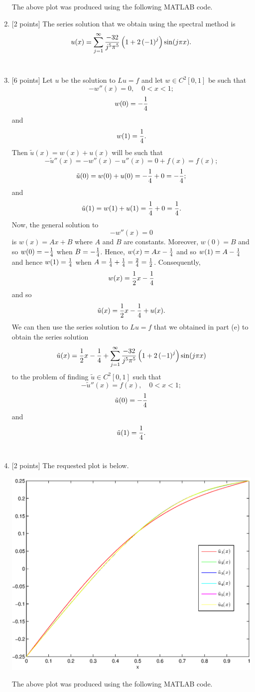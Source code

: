 \begin{solution}
\begin{enumerate}
The above plot was produced using the following MATLAB code.



\item {[2 points]} The series solution that we obtain using the spectral method is
\[
u(x)=\sum_{j=1}^\infty{-32\over j^5\pi^5}\left(1+2\left(-1\right)^j\right)\sin(j\pi x).
\]
\\
\item {[6 points]} Let $u$ be the solution to $Lu=f$ and let $w\in C^2[0,1]$ be such that
\[
-w''(x)=0,\quad0<x<1;
\]
\[
w(0)=-{1\over4}
\]
and
\[
w(1)={1\over4}.
\]
Then $\tilde{u}(x)=w(x)+u(x)$ will be such that
\[
-\tilde{u}''(x)=-w''(x)-u''(x)=0+f(x)=f(x);
\]
\[
\tilde{u}(0)=w(0)+u(0)=-{1\over4}+0=-{1\over4};
\]
and
\[
\tilde{u}(1)=w(1)+u(1)={1\over4}+0={1\over4}.
\]
Now, the general solution to
\[
-w''(x)=0
\]
is $w(x)=Ax+B$ where $A$ and $B$ are constants. Moreover, $w(0)=B$ and so $w(0)=-{1\over4}$ when $B=-{1\over4}$. Hence, $w(x)=Ax-{1\over4}$ and so $w(1)=A-{1\over4}$ and hence $w(1)={1\over4}$ when $A={1\over4}+{1\over4}={2\over4}={1\over2}$. Consequently,
\[
w(x)={1\over2}x-{1\over4}
\]
and so
\[
\tilde{u}(x)={1\over2}x-{1\over4}+u(x).
\]
We can then use the series solution to $Lu=f$ that we obtained in part (e) to obtain the series solution
\[
\tilde{u}(x)={1\over2}x-{1\over4}+\sum_{j=1}^\infty{-32\over j^5\pi^5}\left(1+2\left(-1\right)^j\right)\sin(j\pi x)
\]
to the problem of finding $\tilde{u}\in C^2[0,1]$ such that
\[
-\tilde{u}''(x)=f(x),\quad0<x<1;
\]
\[
\tilde{u}(0)=-{1\over4}
\]
and
\[
\tilde{u}(1)={1\over4}.
\]
\\
\item {[2 points]} The requested plot is below.

\begin{center}\includegraphics[scale=0.7]{hw26g.eps}\end{center}

The above plot was produced using the following MATLAB code.



\end{enumerate}

\end{solution}

